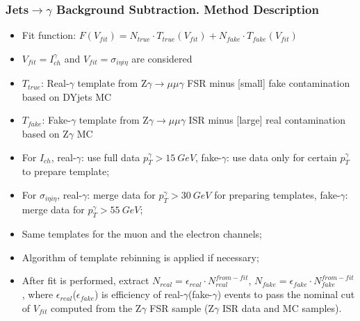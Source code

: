 \begin{frame}\frametitle{Jets$\rightarrow \gamma$ Background Subtraction. Method Description}
  \scriptsize
  \begin{itemize}
    \item Fit function: $F(V_{fit})=N_{true} \cdot T_{true}(V_{fit}) + N_{fake} \cdot T_{fake}(V_{fit})$
    \item $V_{fit}=I_{ch}^{\gamma}$ and $V_{fit}=\sigma_{i\eta{i\eta}}$ are considered
    \item $T_{true}$: Real-$\gamma$ template from Z$\gamma\rightarrow\mu\mu\gamma$ FSR minus [small] fake contamination based on DYjets MC
    \item $T_{fake}$: Fake-$\gamma$ template from Z$\gamma\rightarrow\mu\mu\gamma$ ISR minus [large] real contamination based on Z$\gamma$ MC
    \item For $I_{ch}$, real-$\gamma$: use full data $p_T^{\gamma}>15~GeV$, fake-$\gamma$: use data only for certain $p_T^{\gamma}$ to prepare template;
    \item For $\sigma_{i\eta{i\eta}}$, real-$\gamma$: merge data for $p_T^{\gamma}>30~GeV$ for preparing templates, fake-$\gamma$: merge data for $p_T^{\gamma}>55~GeV$;
    \item Same templates for the muon and the electron channels;
    \item Algorithm of template rebinning is applied if necessary;
    \item After fit is performed, extract $N_{real}=\epsilon_{real} \cdot N_{real}^{from-fit}$,  $N_{fake}=\epsilon_{fake} \cdot N_{fake}^{from-fit}$, where $\epsilon_{real}$($\epsilon_{fake}$) is efficiency of real-$\gamma$(fake-$\gamma$) events to pass the nominal cut of $V_{fit}$ computed from the Z$\gamma$ FSR sample (Z$\gamma$ ISR data and MC samples).
  \end{itemize}
\end{frame}

